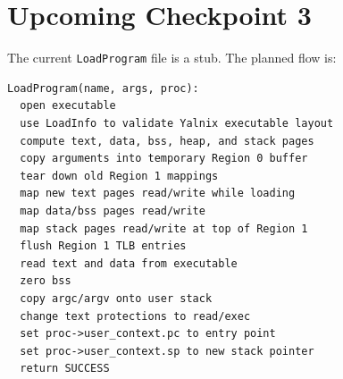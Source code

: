 \documentclass[11pt]{article}
\begin{document}
\section{Upcoming Checkpoint 3}

The current \texttt{LoadProgram} file is a stub. The planned flow is:

\begin{lstlisting}[style=yalnixpseudo]
LoadProgram(name, args, proc):
  open executable
  use LoadInfo to validate Yalnix executable layout
  compute text, data, bss, heap, and stack pages
  copy arguments into temporary Region 0 buffer
  tear down old Region 1 mappings
  map new text pages read/write while loading
  map data/bss pages read/write
  map stack pages read/write at top of Region 1
  flush Region 1 TLB entries
  read text and data from executable
  zero bss
  copy argc/argv onto user stack
  change text protections to read/exec
  set proc->user_context.pc to entry point
  set proc->user_context.sp to new stack pointer
  return SUCCESS
\end{lstlisting}
\end{document}
